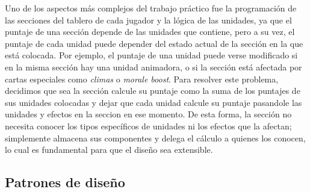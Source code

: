 \documentclass[titlepage,a4paper]{article}
\begin{document}
	Uno de los aspectos más complejos del trabajo práctico fue la programación de las secciones del tablero de cada jugador y la lógica de las unidades, ya que el puntaje de una sección depende de las unidades que contiene, pero a su vez, el puntaje de cada unidad puede depender del estado actual de la sección en la que está colocada.
	Por ejemplo, el puntaje de una unidad puede verse modificado si en la misma sección hay una unidad animadora, o si la sección está afectada por cartas especiales como \textit{climas} o \textit{morale boost}.
	Para resolver este problema, decidimos que sea la sección calcule su puntaje como la suma de los puntajes de sus unidades colocadas y dejar que cada unidad calcule su puntaje pasandole las unidades y efectos en la seccion en ese momento.
	De esta forma, la sección no necesita conocer los tipos específicos de unidades ni los efectos que la afectan; simplemente almacena sus componentes y delega el cálculo a quienes los conocen, lo cual es fundamental para que el diseño sea extensible.


	\subsection{Patrones de diseño}\label{sup:patrones}
\end{document}
